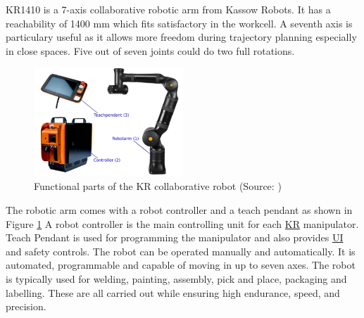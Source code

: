 KR1410 is a 7-axis collaborative robotic arm from Kassow Robots. It has a reachability of 1400 mm which fits
satisfactory in the workcell. A seventh axis is particulary useful as it allows more freedom during trajectory planning
especially in close spaces. Five out of seven joints could do two full rotations.

\begin{figure}[h]
    \centering
    \includegraphics[width=0.5\textwidth]{figures/kassow-robot-parts.png}
    \caption{Functional parts of the KR collaborative robot (Source: \cite{kassow-manual})}
    \label{fig:kassow-robot-parts}
\end{figure}

The robotic arm comes with a robot controller and a teach pendant as shown in Figure \ref{fig:kassow-robot-parts} A robot controller is the main controlling unit for each \hyperref[acro:KR]{KR} manipulator.
Teach Pendant is used for programming the manipulator and also provides \hyperref[acro:UI]{UI} and safety controls. 
The robot can be operated manually and automatically. It is automated, programmable and capable of
moving in up to seven axes. The robot is typically used for welding, painting, assembly, pick and place,
packaging and labelling. These are all carried out while ensuring high endurance, speed, and precision. \cite[page 23]{kassow-manual}


